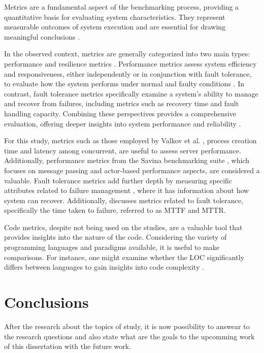 Metrics are a fundamental aspect of the benchmarking process, providing a quantitative basis for evaluating system characteristics. They represent measurable outcomes of system execution and are essential for drawing meaningful conclusions \cite{Almeida2013}.

In the observed context, metrics are generally categorized into two main types: performance and resilience metrics \cite{Valkov2018,Randtoul2022,Almeida2013}. Performance metrics assess system efficiency and responsiveness, either independently or in conjunction with fault tolerance, to evaluate how the system performs under normal and faulty conditions \cite{Valkov2018}. In contrast, fault tolerance metrics specifically examine a system's ability to manage and recover from failures, including metrics such as recovery time and fault handling capacity. Combining these perspectives provides a comprehensive evaluation, offering deeper insights into system performance and reliability \cite{Randtoul2022}.

For this study, metrics such as those employed by Valkov et al. \cite{Valkov2018}, process creation time and latency among concurrent, are useful to assess server performance. Additionally, performance metrics from the Savina benchmarking suite \cite{Imam2014}, which focuses on message passing and actor-based performance aspects, are considered a valuable. Fault tolerance metrics add further depth by measuring specific attributes related to failure management \cite{Randtoul2022}, where it has information about how system can recover. Additionally, \textcite{Tanenbaum2023} discusses metrics related to fault tolerance, specifically the time taken to failure, referred to as \gls{MTTF} and \gls{MTTR}.

Code metrics, despite not being used on the studies, are a valuable tool that provides insights into the nature of the code. Considering the variety of programming languages and paradigms available, it is useful to make comparisons. For instance, one might examine whether the \gls{LOC} significantly differs between languages to gain insights into code complexity \cite{Tanenbaum2023}.

\section{Conclusions}

After the research about the topics of study, it is now possibility to answear to the research questions and also state what are the goals to the upcomming work of this dissertation with the future work.


